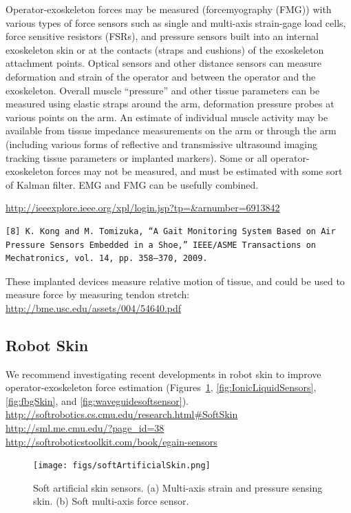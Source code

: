 \documentclass[letterpaper,12pt,fullpage]{article}
\begin{document}
Operator-exoskeleton forces may be measured (forcemyography (FMG))
with various types of
force sensors such as single and multi-axis strain-gage load cells,
force sensitive resistors (FSRs), and pressure sensors built into an internal exoskeleton skin or at the
contacts (straps and cushions) of the exoskeleton attachment points.
Optical sensors and other distance sensors can measure deformation and
strain of the operator and between the operator and the exoskeleton.
Overall muscle ``pressure'' and other tissue parameters can be measured using
elastic straps around the arm, deformation pressure probes at various
points on the arm.
An estimate of individual muscle activity
may be available from tissue impedance measurements on the arm
or through the arm (including various forms of reflective and transmissive
ultrasound imaging tracking tissue parameters or implanted markers).
Some or all operator-exoskeleton forces may not be measured, and must
be estimated with some sort of Kalman filter.
EMG and FMG can be usefully combined.

\url{http://ieeexplore.ieee.org/xpl/login.jsp?tp=&arnumber=6913842}\\

\begin{verbatim}
[8] K. Kong and M. Tomizuka, “A Gait Monitoring System Based on Air
Pressure Sensors Embedded in a Shoe,” IEEE/ASME Transactions on
Mechatronics, vol. 14, pp. 358–370, 2009.
\end{verbatim}

These implanted devices measure relative motion of tissue, and could be used
to measure force by measuring tendon stretch:\\
\url{http://bme.usc.edu/assets/004/54640.pdf}

\subsection{Robot Skin}

We recommend investigating recent developments in robot skin to improve
operator-exoskeleton force estimation (Figures~\ref{fig:softArtificialSkin}, \ref{fig:IonicLiquidSensors}, \ref{fig:fbgSkin}, and \ref{fig:waveguidesoftsensor}).\\
\url{http://softrobotics.cs.cmu.edu/research.html#SoftSkin}\\
\url{http://sml.me.cmu.edu/?page_id=38}\\
\url{http://softroboticstoolkit.com/book/egain-sensors}

\begin{figure}
\centering
\texttt{[image: figs/softArtificialSkin.png]}
\caption{Soft artificial skin sensors. (a) Multi-axis strain and pressure sensing skin. (b) Soft multi-axis force sensor.}
\label{fig:softArtificialSkin}
\end{figure}
\end{document}
